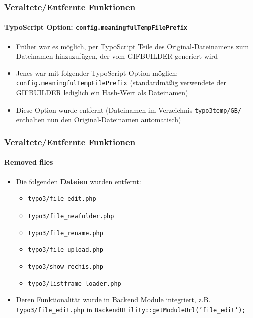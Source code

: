 \begin{frame}[fragile]
	\frametitle{Veraltete/Entfernte Funktionen}
	\framesubtitle{TypoScript Option: \texttt{config.meaningfulTempFilePrefix}}

	\begin{itemize}

		\item Früher war es möglich, per TypoScript Teile des Original-Dateinamens zum
			Dateinamen hinzuzufügen, der vom GIFBUILDER generiert wird

		\item Jenes war mit folgender TypoScript Option möglich:\newline
			\texttt{config.meaningfulTempFilePrefix}\newline
			\small
				(standardmäßig verwendete der GIFBUILDER lediglich ein Hash-Wert als Dateinamen)
			\normalsize

		\item Diese Option wurde entfernt\newline
			\small
				(Dateinamen im Verzeichnis \texttt{typo3temp/GB/}
				enthalten nun den Original-Dateinamen automatisch)
			\normalsize

	\end{itemize}

\end{frame}




\begin{frame}[fragile]
	\frametitle{Veraltete/Entfernte Funktionen}
	\framesubtitle{Removed files}

	\begin{itemize}
		\item Die folgenden \textbf{Dateien} wurden entfernt:

			\begin{itemize}
				\item \texttt{typo3/file\_edit.php}
				\item \texttt{typo3/file\_newfolder.php}
				\item \texttt{typo3/file\_rename.php}
				\item \texttt{typo3/file\_upload.php}
				\item \texttt{typo3/show\_rechis.php}
				\item \texttt{typo3/listframe\_loader.php}
			\end{itemize}

		\item Deren Funktionalität wurde in Backend Module integriert,
			z.B. \texttt{typo3/file\_edit.php} in \texttt{BackendUtility::getModuleUrl('file\_edit');}

	\end{itemize}

\end{frame}

